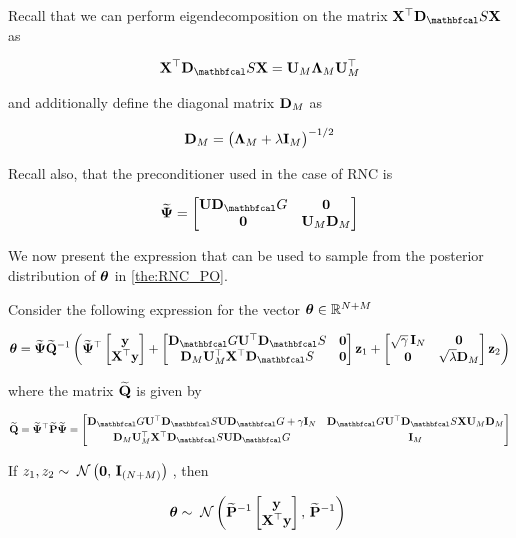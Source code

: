 Recall that we can perform eigendecomposition on the matrix $\X^\top\D_\St \X$ as 

$$
\X^\top\D_\St \X = \U_M \LAM_M \U_M^\top
$$

and additionally define the diagonal matrix $\mathbf{D}_M $ as

$$
\mathbf{D}_M = \big(\mathbf{\Lambda}_M + \lambda \mathbf{I}_M \big)^{-1/2}
$$

Recall also, that the preconditioner used in the case of RNC is 

$$
\widetilde{\PSI} = \begin{bmatrix}
    \U \D_\Gt & \zero \\
    \zero & \U_M \D_M 
\end{bmatrix}
$$

We now present the expression that can be used to sample from the posterior distribution of $\boldsymbol{\theta}$ in \cref{the:RNC_PO}.

\begin{theorem}

    Consider the following expression for the vector $\boldsymbol{\theta} \in \mathbb{R}^{N + M}$

    \begin{equation}
        \thetaa = \widetilde{\PSI} \widetilde{\Q}^{-1} \left(\widetilde{\PSI}^\top \begin{bmatrix} \y \\ \X^\top \y \end{bmatrix} + \begin{bmatrix}
            \D_\Gt \U^\top \D_\St & \zero \\
            \D_M \U_M^\top \X^\top \D_\St & \zero
        \end{bmatrix} \z_1 + \begin{bmatrix}
            \sqrt{\gamma} \, \I_N & \zero \\
            \zero & \sqrt{\lambda} \D_M
        \end{bmatrix} \z_2 \right)
        \label{eq:PO_sample_RNC}
    \end{equation}

    where the matrix $\widetilde{\mathbf{Q}}$ is given by 

    $$
    \widetilde{\Q} = \widetilde{\PSI}^\top \widetilde{\PP} \widetilde{\PSI}  = \begin{bmatrix}
        \D_\Gt \U^\top \D_\St \U \D_\Gt + \gamma \I_{N}  &  \D_\Gt \U^\top \D_\St \X \U_M \D_M \\[0.1cm] 
        \D_M \U_M^\top \X^\top \D_\St \U \D_\Gt & \I_M
        \end{bmatrix}
    $$

    If $z_1, z_2 \sim \; \mathcal{N}\left(\mathbf{0}, \, \mathbf{I}_{(N+M)}\right) \;$, then
    
    $$
    \boldsymbol{\theta} \sim \; \mathcal{N}\left(\widetilde{\mathbf{P}}^{-1} \begin{bmatrix} \mathbf{y} \\ \mathbf{X}^\top \mathbf{y} \end{bmatrix}, \, \widetilde{\mathbf{P}}^{-1}\right) \;
    $$ 
    
    \label{the:RNC_PO}
\end{theorem}

